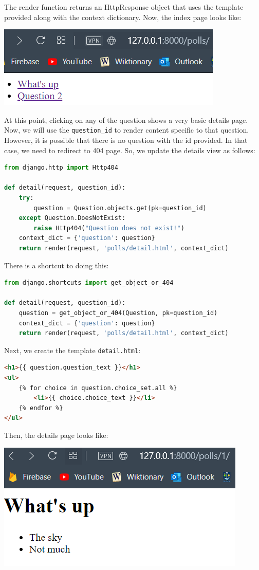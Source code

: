 \documentclass[a4paper, openany]{memoir}
\begin{document}
    The render function returns an HttpResponse object that uses the template provided along with the context dictionary. Now, the index page looks like:
    \begin{center}
        \includegraphics[scale=0.7]{src/Django8.PNG}
    \end{center}
    \noindent At this point, clicking on any of the question shows a very basic details page. Now, we will use the \texttt{question\_id} to render content specific to that question. However, it is possible that there is no question with the id provided. In that case, we need to redirect to 404 page. So, we update the details view as follows:
\begin{lstlisting}[language=python]
from django.http import Http404

def detail(request, question_id):
    try:
        question = Question.objects.get(pk=question_id)
    except Question.DoesNotExist:
        raise Http404("Question does not exist!")
    context_dict = {'question': question}
    return render(request, 'polls/detail.html', context_dict)
\end{lstlisting}
    There is a shortcut to doing this:
\begin{lstlisting}[language=python]
from django.shortcuts import get_object_or_404

def detail(request, question_id):
    question = get_object_or_404(Question, pk=question_id)
    context_dict = {'question': question}
    return render(request, 'polls/detail.html', context_dict)
\end{lstlisting}
    Next, we create the template \texttt{detail.html}:
\begin{lstlisting}[language=html]
<h1>{{ question.question_text }}</h1>
<ul>
    {% for choice in question.choice_set.all %}
        <li>{{ choice.choice_text }}</li>
    {% endfor %}
</ul>
\end{lstlisting}
    Then, the details page looks like:
    \begin{center}
        \includegraphics[scale=0.7]{src/Django9.PNG}
    \end{center}
\end{document}
